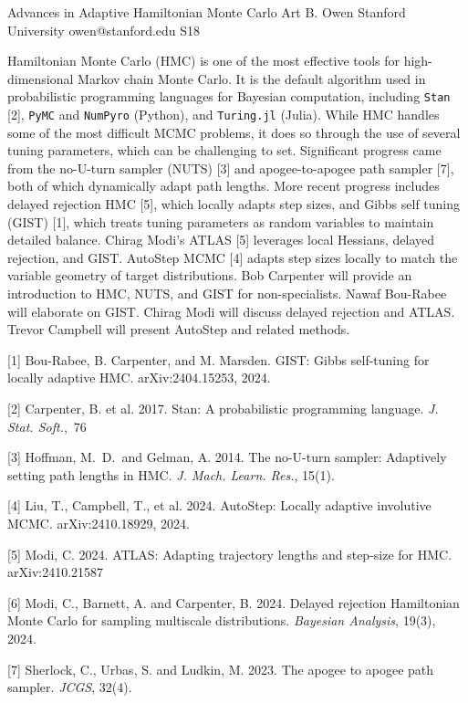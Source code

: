 \begin{session}
 {Advances in Adaptive Hamiltonian Monte Carlo}%
 {Art B. Owen}%
 {Stanford University}%
 {owen@stanford.edu}%
{}{}{}
 {S18}%
{}

 Hamiltonian Monte Carlo (HMC) is one of the most effective tools for high-dimensional Markov chain Monte Carlo. It is the default algorithm used in probabilistic programming languages for Bayesian computation, including \texttt{Stan} [2], \texttt{PyMC} and \texttt{NumPyro} (Python), and \texttt{Turing.jl} (Julia).  While HMC handles some of the most difficult MCMC problems, it does so through the use of several tuning parameters, which can be challenging to set.
 Significant progress came from the no-U-turn sampler (NUTS) [3] and apogee-to-apogee path sampler [7], both of which dynamically adapt path lengths. More recent progress includes delayed rejection HMC [5], which locally adapts step sizes, and
 Gibbs self tuning (GIST) [1], which treats tuning parameters as random variables to maintain detailed balance.  Chirag Modi's ATLAS [5] leverages local Hessians, delayed rejection, and GIST.  AutoStep MCMC [4] adapts step sizes locally to match the variable geometry of target distributions.
 Bob Carpenter will provide an introduction to HMC, NUTS, and GIST for non-specialists. Nawaf Bou-Rabee will elaborate on GIST. Chirag Modi will discuss delayed rejection and ATLAS. Trevor Campbell will present AutoStep and related methods.
 \medskip
 \begin{description}
 \item{[1]} Bou-Rabee, B. Carpenter, and M. Marsden. GIST: Gibbs self-tuning for locally adaptive HMC. arXiv:2404.15253, 2024.
 \item{[2]} Carpenter, B. et al. 2017. Stan: A probabilistic programming language. \textit{J. Stat. Soft.},~76
 \item{[3]} Hoffman, M.~D.\ and Gelman, A. 2014. The no-U-turn sampler: Adaptively setting path lengths in HMC. \textit{J. Mach. Learn. Res.}, 15(1).
 \item{[4]} Liu, T., Campbell, T., et al. 2024. AutoStep: Locally adaptive involutive MCMC. arXiv:2410.18929, 2024.
 \item{[5]} Modi, C. 2024. ATLAS: Adapting trajectory lengths and step-size for HMC. arXiv:2410.21587
 \item{[6]} Modi, C., Barnett, A. and Carpenter, B. 2024. Delayed rejection Hamiltonian Monte Carlo for sampling multiscale distributions. \textit{Bayesian Analysis}, 19(3), 2024.
 \item{[7]} Sherlock, C., Urbas, S. and Ludkin, M. 2023. The apogee to apogee path sampler. \textit{JCGS}, 32(4).
 \end{description}
\end{session}

